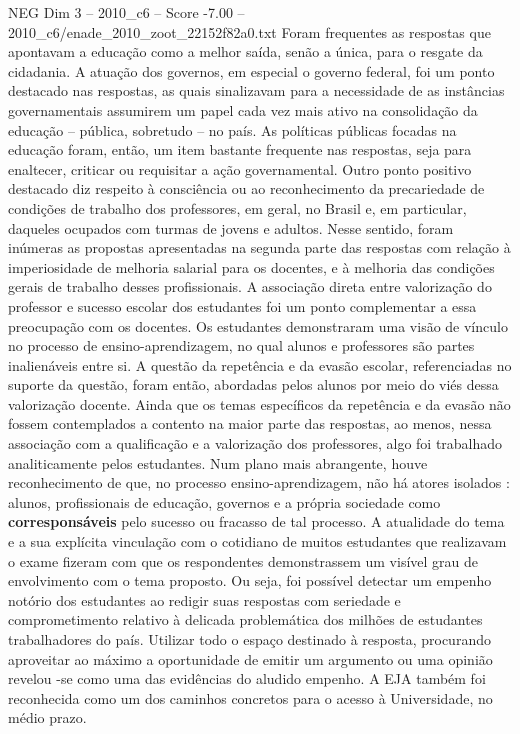 \begin{textsample}{NEG Dim 3 – 2010\_c6 – Score -7.00 – 2010\_c6/enade\_2010\_zoot\_22152f82a0.txt}
Foram frequentes as respostas que apontavam a educação como a melhor saída, senão a única, para o resgate da cidadania.
A atuação dos governos, em especial o governo federal, foi um ponto destacado nas respostas, as quais sinalizavam para a necessidade de as instâncias governamentais assumirem um papel cada vez mais ativo na consolidação da educação – pública, sobretudo – no país.
As políticas públicas focadas na educação foram, então, um item bastante frequente nas respostas, seja para enaltecer, criticar ou requisitar a ação governamental.
Outro ponto positivo destacado diz respeito à consciência ou ao reconhecimento da precariedade de condições de trabalho dos professores, em geral, no Brasil e, em particular, daqueles ocupados com turmas de jovens e adultos.
Nesse sentido, foram inúmeras as propostas apresentadas na segunda parte das respostas com relação à imperiosidade de melhoria salarial para os docentes, e à melhoria das condições gerais de trabalho desses profissionais.
A associação direta entre valorização do professor e sucesso escolar dos estudantes foi um ponto complementar a essa preocupação com os docentes.
Os estudantes demonstraram uma visão de vínculo no processo de ensino-aprendizagem, no qual alunos e professores são partes inalienáveis entre si.
A questão da repetência e da evasão escolar, referenciadas no suporte da questão, foram então, abordadas pelos alunos por meio do viés dessa valorização docente.
Ainda que os temas específicos da repetência e da evasão não fossem contemplados a contento na maior parte das respostas, ao menos, nessa associação com a qualificação e a valorização dos professores, algo foi trabalhado analiticamente pelos estudantes.
Num plano mais abrangente, houve reconhecimento de que, no processo ensino-aprendizagem, não há atores isolados : alunos, profissionais de educação, governos e a própria sociedade como \textbf{corresponsáveis} pelo sucesso ou fracasso de tal processo.
A atualidade do tema e a sua explícita vinculação com o cotidiano de muitos estudantes que realizavam o exame fizeram com que os respondentes demonstrassem um visível grau de envolvimento com o tema proposto.
Ou seja, foi possível detectar um empenho notório dos estudantes ao redigir suas respostas com seriedade e comprometimento relativo à delicada problemática dos milhões de estudantes trabalhadores do país.
Utilizar todo o espaço destinado à resposta, procurando aproveitar ao máximo a oportunidade de emitir um argumento ou uma opinião revelou -se como uma das evidências do aludido empenho.
A EJA também foi reconhecida como um dos caminhos concretos para o acesso à Universidade, no médio prazo.

\end{textsample}
